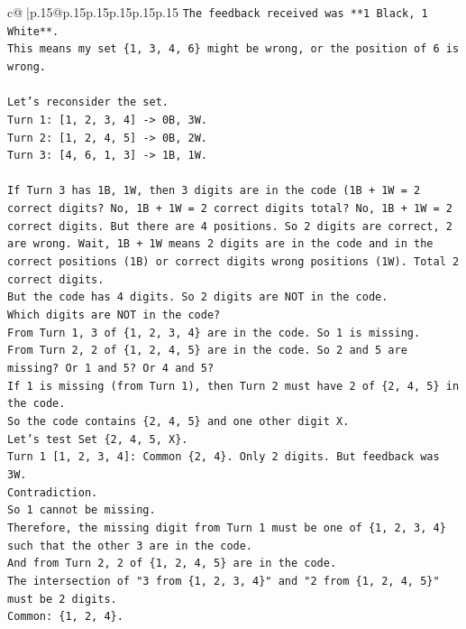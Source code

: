 \documentclass{article}
\begin{document}
{\begin{supertabular}{c@{$\;$}|p{.15\linewidth}@{}p{.15\linewidth}p{.15\linewidth}p{.15\linewidth}p{.15\linewidth}p{.15\linewidth}}
{{{\texttt{The feedback received was **1 Black, 1 White**.} \\
\texttt{This means my set \{1, 3, 4, 6\} might be wrong, or the position of 6 is wrong.} \\
\\ 
\texttt{Let's reconsider the set.} \\
\texttt{Turn 1: {[}1, 2, 3, 4{]} {-}> 0B, 3W.} \\
\texttt{Turn 2: {[}1, 2, 4, 5{]} {-}> 0B, 2W.} \\
\texttt{Turn 3: {[}4, 6, 1, 3{]} {-}> 1B, 1W.} \\
\\ 
\texttt{If Turn 3 has 1B, 1W, then 3 digits are in the code (1B + 1W = 2 correct digits? No, 1B + 1W = 2 correct digits total? No, 1B + 1W = 2 correct digits. But there are 4 positions. So 2 digits are correct, 2 are wrong. Wait, 1B + 1W means 2 digits are in the code and in the correct positions (1B) or correct digits wrong positions (1W). Total 2 correct digits.} \\
\texttt{But the code has 4 digits. So 2 digits are NOT in the code.} \\
\texttt{Which digits are NOT in the code?} \\
\texttt{From Turn 1, 3 of \{1, 2, 3, 4\} are in the code. So 1 is missing.} \\
\texttt{From Turn 2, 2 of \{1, 2, 4, 5\} are in the code. So 2 and 5 are missing? Or 1 and 5? Or 4 and 5?} \\
\texttt{If 1 is missing (from Turn 1), then Turn 2 must have 2 of \{2, 4, 5\} in the code.} \\
\texttt{So the code contains \{2, 4, 5\} and one other digit X.} \\
\texttt{Let's test Set \{2, 4, 5, X\}.} \\
\texttt{Turn 1 {[}1, 2, 3, 4{]}: Common \{2, 4\}. Only 2 digits. But feedback was 3W.} \\
\texttt{Contradiction.} \\
\texttt{So 1 cannot be missing.} \\
\texttt{Therefore, the missing digit from Turn 1 must be one of \{1, 2, 3, 4\} such that the other 3 are in the code.} \\
\texttt{And from Turn 2, 2 of \{1, 2, 4, 5\} are in the code.} \\
\texttt{The intersection of "3 from \{1, 2, 3, 4\}" and "2 from \{1, 2, 4, 5\}" must be 2 digits.} \\
\texttt{Common: \{1, 2, 4\}.} \\
}}}
\end{supertabular}}
\end{document}
